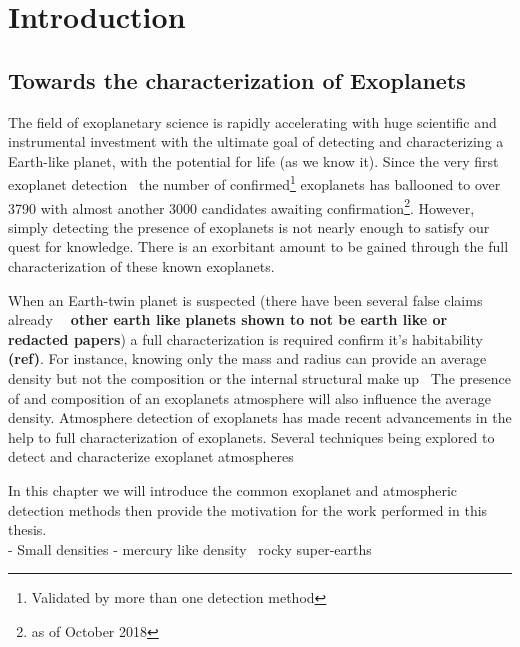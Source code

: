 \chapter{Introduction}\label{cha:introduction}

\section{Towards the characterization of Exoplanets}

The field of exoplanetary science is rapidly accelerating with huge scientific and instrumental investment with the ultimate goal of detecting and characterizing a Earth-like planet, with the potential for life (as we know it).
Since the very first exoplanet detection~\citet{mayor_jupitermass_1995} the number of confirmed\footnote{Validated by more than one detection method} exoplanets has ballooned to over 3790 with almost another 3000 candidates awaiting confirmation\footnote{as of October 2018}.
However, simply detecting the presence of exoplanets is not nearly enough to satisfy our quest for knowledge.
There is an exorbitant amount to be gained through the full characterization of these known exoplanets.

When an Earth-twin planet is suspected (there have been several false claims already \textbf{~\citep[e.g.][]{mullally_kepler_2018, more} other earth like planets shown to not be earth like or redacted papers}) a full characterization is required confirm it's habitability \textbf{(ref)}.
For instance, knowing only the mass and radius can provide an average density but not the composition or the internal structural make up~\citet{a paper about composition degeneracy}
 The presence of and composition of an exoplanets atmosphere will also influence the average density.
 Atmosphere detection of exoplanets has made recent advancements in the help to full characterization of exoplanets.
 Several techniques being explored to detect and characterize exoplanet atmospheres~\citep[e.g.][]{martins_reflected_2015, transmission spectroscopy,  piskorz_evidence_2016  ,snellen?}

In this chapter we will introduce the common exoplanet and atmospheric detection methods then provide the motivation for the work performed in this thesis.\\


- Small densities - mercury like  density~\citet{dittmann_temperate_2017, santerne_earthsized_2018, ment_second_2018} rocky super-earths\\


